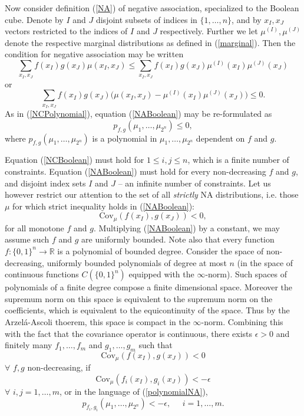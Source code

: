 \documentclass[11pt]{article}
\newcommand{\R}{\mathbb{R}}
\newcommand{\C}{\text{Cov}}
\begin{document}
Now consider definition (\ref{NA}) of negative association, specialized to the Boolean cube. Denote by $I$ and $J$ disjoint subsets of indices in $\{1,\dots, n\}$,
and by $x_I,x_J$ vectors restricted to the indices of $I$ and $J$ respectively.
Further we let $\mu^{(I)},\mu^{(J)}$ denote the respective marginal
distributions as defined in (\ref{marginal}). Then the condition for 
negative association may be written 
\[
\sum_{x_I,x_J} f(x_I)g(x_J) \mu(x_I,x_J) \leq \sum_{x_I,x_J} f(x_I)g(x_J)
\mu^{(I)}(x_I)\mu^{(J)}(x_J)
\]
or
\begin{equation}\label{NABoolean}
\sum_{x_I,x_J} f(x_I)g(x_J)\big(\mu(x_I,x_J)-\mu^{(I)}(x_I)\mu^{(J)}(x_J)\big)\leq 0.
\end{equation}
As in (\ref{NCPolynomial}), equation (\ref{NABoolean}) 
may be re-formulated as 
\begin{equation}\label{polynomialNA}
p_{f,g}(\mu_1,\dots,\mu_{2^n}) \leq 0,
\end{equation}
where $p_{f,g}(\mu_1,\dots,\mu_{2^n})$ is a polynomial in 
$\mu_1,\dots, \mu_{2^n}$ dependent on $f$ and $g$. 




Equation (\ref{NCBoolean}) must hold for $1\leq i,j\leq n$, which 
is a finite number of constraints. 
Equation (\ref{NABoolean}) must hold for every non-decreasing $f$ and $g$, and 
disjoint index sets $I$ and $J$ -- an infinite number of constraints. Let
us however restrict our attention
to the set of all {\it strictly} NA distributions, i.e. those $\mu$ for which 
strict inequality holds in (\ref{NABoolean}):
\[
\C_{\mu}(f(x_I),g(x_J)) <0,
\]
for all monotone $f$ and $g$.
Multiplying (\ref{NABoolean}) 
by a constant, we may assume such $f$ and $g$ are uniformly bounded.
Note also that every function $f:\{0,1\}^n\to \R$ is a polynomial of bounded degree.
Consider the space of non-decreasing, uniformly bounded polynomials of degree at most $n$ (in the space
of continuous functions $C(\{0,1\}^n)$ equipped with the $\infty$-norm). 
Such spaces of polynomials of a finite degree compose a finite dimensional space. Moreover the supremum norm on this space is equivalent to the supremum norm on the coefficients, which is equivalent to the equicontinuity of the space. %
Thus by the Arzel\'a-Ascoli thoerem, this space is compact in the $\infty$-norm.
Combining this with the fact that the covariance operator is continuous,
there exists $\epsilon>0$ and finitely many $f_1,\dots, f_m$ and 
$g_1,\dots, g_m$ such that 
\[
\C_{\mu}(f(x_I),g(x_J)) <0
\]
$\forall$ $f,g$ non-decreasing, if 
\[
\C_{\mu}(f_i(x_I),g_i(x_J)) < -\epsilon
\]
$\forall$ $i,j=1,\dots, m$, or in the language of (\ref{polynomialNA}),
\begin{equation}\label{NAPolynomial2}
p_{f_i,g_i}(\mu_1,\dots,\mu_{2^n}) < -\epsilon, \;\;\;\;\; i=1,\dots,m.
\end{equation}
\end{document}
